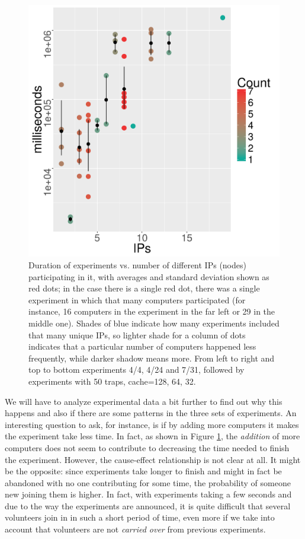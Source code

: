 \documentclass[letterpaper]{article}
\begin{document}
\begin{figure}[!htb]
\includegraphics[width=0.32\linewidth]{time-vs-ips-alife-32.png}
\caption{Duration of experiments vs. number of different IPs (nodes)
  participating in it, with averages and standard deviation shown as
  red dots; in the case there is a single red dot, there was a single
  experiment in which that many computers participated (for instance, 16
  computers in the experiment in the far left or 29 in the middle
  one). 
Shades of blue indicate how many experiments included that many unique IPs,
so lighter shade for a column of dots indicates that a particular number
of computers happened less frequently, while darker shadow means more. 
From left to right and top to bottom experiments 4/4, 4/24 and 7/31,
followed by experiments with 50 traps, cache=128, 64, 32.}
\label{fig:duration}
\end{figure}
%
We will have to analyze experimental data a bit further to find out why
this happens and also if there are some patterns in the three sets of
experiments. An interesting question to ask, for instance, is if 
by adding more computers it makes the experiment take less time. In fact, as
shown in Figure \ref{fig:duration}, the {\em addition} of more computers does
not seem to contribute to decreasing the time needed to finish the
experiment. However, the cause-effect relationship is not clear at
all. It might be the opposite: since experiments take longer to finish
and might in fact be abandoned with no one contributing for some time,
the probability of someone new joining them is higher. In fact,
with experiments taking a few seconds and due to the way the
experiments are announced, it is quite difficult that several
volunteers join in in such a short period of time, even more if we take
into account that volunteers are not {\em carried over} from previous
experiments. 
%
\end{document}
